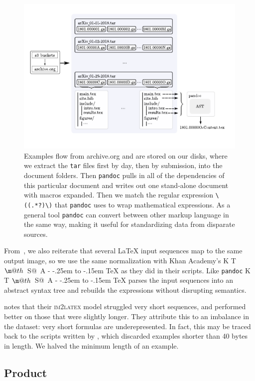 \documentclass{article}
\makeatletter
\DeclareRobustCommand{\KaTeX}{K%
  {%
    \setbox0\hbox{T}%
    \setbox\@tempboxa\hbox{$\m@th$%
      \csname S@\f@size\endcsname
      \fontsize\sf@size\z@
      \math@fontsfalse\selectfont
      A}%
    \@tempdima\ht0
    \advance\@tempdima-\ht\@tempboxa
    \@tempdima\strip@pt\fontdimen1\font\@tempdima
    \advance\@tempdima-.25em
    \kern\@tempdima
    \vbox to\ht0{\box\@tempboxa
      \vss}%
  }%
  \kern-.15em
  \TeX}
\makeatother
\begin{document}
\begin{figure}[]
		\includegraphics[scale=1.7]{assets/harvest.pdf}
    \centering
    \cprotect\caption{Examples flow from archive.org and are stored on our
    disks, where we extract the \texttt{tar} files first by day, then by
    submission, into the document folders. Then \texttt{pandoc} pulls in all of
    the dependencies of this particular document and writes out one stand-alone
    document with macros expanded. Then we match the regular expression
    \verb|\((.*?)\)| that \texttt{pandoc} uses to wrap mathematical expressions.
    As a general tool \texttt{pandoc} can convert between other markup language
    in the same way, making it useful for standardizing data from disparate
    sources.}\label{datapipeline}
\end{figure}

From~\cite{deng2016you}, we also reiterate that several \LaTeX{} input sequences
map to the same output image, so we use the same normalization with Khan
Academy's \KaTeX{} as they did in their scripts. Like \texttt{pandoc} \KaTeX{}
parses the input sequences into an abstract syntax tree and rebuilds the
expressions without disrupting
semantics. %

\cite[5]{bender2019learning} notes that their \textsc{im2latex} model struggled
very short sequences, and performed better on those that were slightly longer.
They attribute this to an imbalance in the dataset: very short formulas are
underepresented. In fact, this may be traced back to the scripts written by
\cite{deng2016you}, which discarded examples shorter than 40 bytes in length. We
halved the minimum length of an example.

\subsection{Product}
\end{document}
